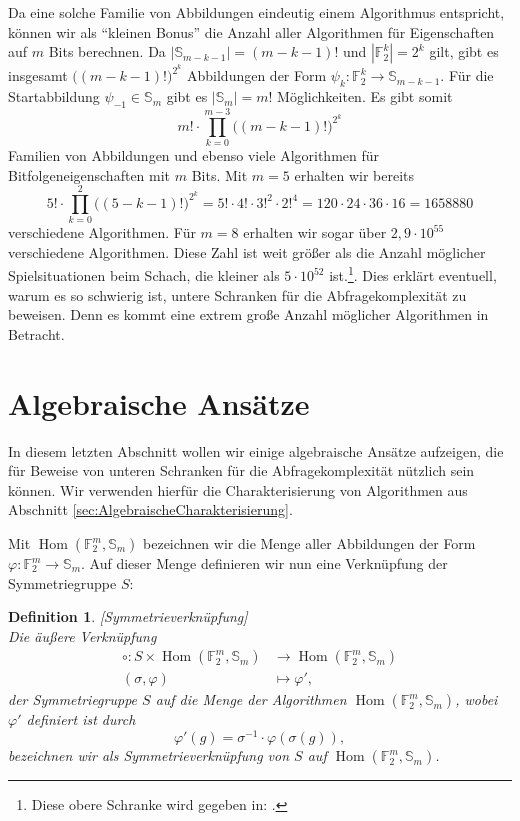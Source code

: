 \documentclass[10pt,a4paper, footheight=1mm]{scrreprt}
\newtheorem{definition}{Definition}
\theoremstyle{definition}
\DeclareMathOperator\Hom{Hom}
\begin{document}
Da eine solche Familie von Abbildungen eindeutig
einem Algorithmus entspricht, können wir als "`kleinen Bonus"'
die Anzahl aller Algorithmen für Eigenschaften auf $m$ Bits
berechnen. Da $|\mathbb{S}_{m-k-1}|=(m-k-1)!$ und
$|\mathbb{F}_2^k| = 2^k$ gilt, gibt es
insgesamt $\big((m-k-1)!\big)^{2^k}$ Abbildungen der Form
$\psi_k:\mathbb{F}_2^k \to \mathbb{S}_{m-k-1}$.
Für die Startabbildung $\psi_{-1}\in\mathbb{S}_m$ gibt
es $|\mathbb{S}_m| = m!$ Möglichkeiten.
Es gibt somit
$$m!\cdot \prod_{k=0}^{m-3} \big((m-k-1)!\big)^{2^k} $$
Familien von Abbildungen und ebenso viele Algorithmen
für Bitfolgeneigenschaften mit $m$ Bits.
Mit $m=5$ erhalten wir bereits 
$$5!\cdot \prod_{k=0}^2 \big((5-k-1)!\big)^{2^k}
= 5!\cdot 4! \cdot 3!^2 \cdot 2!^4
= 120 \cdot 24 \cdot 36 \cdot 16 = 1658880
$$
verschiedene Algorithmen. Für $m=8$ erhalten wir sogar
über $2,9 \cdot 10^{55}$ verschiedene Algorithmen. Diese
Zahl ist weit größer als die Anzahl möglicher 
Spielsituationen beim Schach, die kleiner als $5\cdot 10^{52}$
ist.\footnote{Diese obere Schranke wird gegeben in:
\cite{Allis}.}.
Dies erklärt eventuell, warum es so schwierig ist, untere
Schranken für die Abfragekomplexität zu beweisen. Denn
es kommt eine extrem große Anzahl möglicher Algorithmen
in Betracht.

\section{Algebraische Ansätze}
\label{sec:AlgebraischeAnsaetze}
In diesem letzten Abschnitt wollen wir einige algebraische
Ansätze aufzeigen, die für Beweise von unteren
Schranken für die Abfragekomplexität nützlich sein können.
Wir verwenden hierfür die Charakterisierung von Algorithmen
aus Abschnitt \ref{sec:AlgebraischeCharakterisierung}.

Mit $\Hom(\mathbb{F}_2^m, \mathbb{S}_m)$ bezeichnen wir die
Menge aller Abbildungen der Form 
$\varphi: \mathbb{F}_2^m \to \mathbb{S}_m$.
Auf dieser Menge definieren wir nun eine Verknüpfung
der Symmetriegruppe $S$:

\begin{definition}
\label{def:Symmetrieverknuepfung}
[Symmetrieverknüpfung]
\ \\
Die äußere Verknüpfung
\begin{align*} 
\circ: S \times \Hom(\mathbb{F}_2^m, \mathbb{S}_m) &\to 
\Hom(\mathbb{F}_2^m, \mathbb{S}_m) \\
(\sigma, \varphi) &\mapsto \varphi',
\end{align*}
der Symmetriegruppe $S$ auf die Menge der Algorithmen 
$\Hom(\mathbb{F}_2^m, \mathbb{S}_m)$, wobei $\varphi'$ definiert ist durch 
$$\varphi'(g)=\sigma^{-1} \cdot \varphi(\sigma(g)),$$
bezeichnen wir als \emph{Symmetrieverknüpfung} von
$S$ auf  $\Hom(\mathbb{F}_2^m, \mathbb{S}_m)$.
\end{definition}
\end{document}
